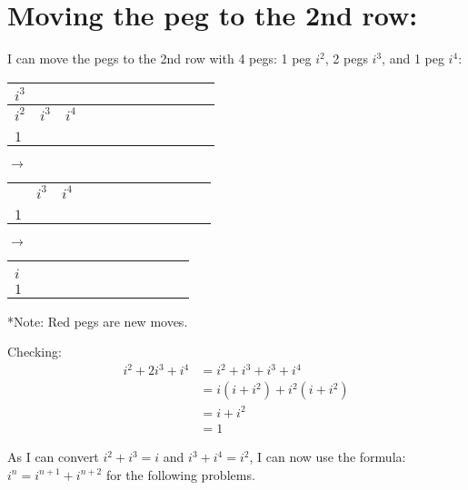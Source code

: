 \documentclass[12pt]{article}
\begin{document}
    
\section{Moving the peg to the 2nd row:}

I can move the pegs to the 2nd row with 4 pegs: 1 peg $i^2$, 2 pegs $i^3$, and 1 peg $i^4$:


\begin{tabular}{|l|c|c|c|c|c|c|c|c|c|c|r|}
    \hline
    $i^3$ &  & \\
    \hline
    $i^2$ & $i^3$ & $i^4$  \\
    \hline
    &  &  \\
    \hline
    $1$ &  &  \\
    \hline
\end{tabular}
$\longrightarrow$
\begin{tabular}{|l|c|c|c|c|c|c|c|c|c|c|r|}
    \hline
    &  & \\
    \hline
    & $i^3$ & $i^4$  \\
    \hline
    \color{red}{$i$} &  &  \\
    \hline
    $1$ &  &  \\
    \hline
\end{tabular}
$\longrightarrow$
\begin{tabular}{|l|c|c|c|c|c|c|c|c|c|c|r|}
    \hline
    \\
    \hline
    \color{red}{$i^2$} \\
    \hline
    $i$ \\
    \hline
    $1$ \\
    \hline
\end{tabular}

*Note: Red pegs are new moves.


\noindent Checking:
    \begin{align*}
        i^2+2i^3+i^4 &= i^2+i^3+i^3+i^4\\
        &= i \left(i+i^2 \right)+i^2 \left(i+i^2 \right)\\
        &=i+ i^2\\
        &= 1
    \end{align*}


\noindent *As I can convert $i^2+i^3=i$ and $i^3+i^4=i^2$, I can now use the formula: $i^n=i^{n+1}+i^{n+2}$ for the following problems.
    
\end{document}
